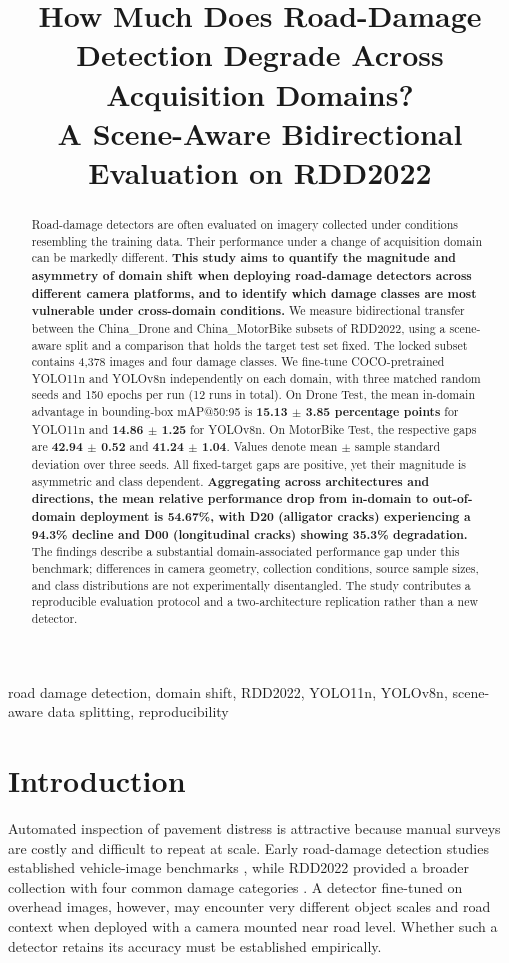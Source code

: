 \documentclass[conference,a4paper]{IEEEtran}
\title{How Much Does Road-Damage Detection Degrade Across Acquisition Domains?\\A Scene-Aware Bidirectional Evaluation on RDD2022}
\author{\IEEEauthorblockN{Lê Thành Luân\IEEEauthorrefmark{1}, Phạm Bá Anh Tuấn\IEEEauthorrefmark{2}}\IEEEauthorblockA{University of Science and Technology -- The University of Danang, Da Nang, Vietnam\\\IEEEauthorrefmark{1}102250416@hv.dut.udn.vn; \IEEEauthorrefmark{2}102250421@hv.dut.udn.vn}}
\begin{document}
\maketitle
\begin{abstract}
Road-damage detectors are often evaluated on imagery collected under conditions resembling the training data. Their performance under a change of acquisition domain can be markedly different. \textbf{This study aims to quantify the magnitude and asymmetry of domain shift when deploying road-damage detectors across different camera platforms, and to identify which damage classes are most vulnerable under cross-domain conditions.} We measure bidirectional transfer between the China\_Drone and China\_MotorBike subsets of RDD2022, using a scene-aware split and a comparison that holds the target test set fixed. The locked subset contains 4,378 images and four damage classes. We fine-tune COCO-pretrained YOLO11n and YOLOv8n independently on each domain, with three matched random seeds and 150 epochs per run (12 runs in total). On Drone Test, the mean in-domain advantage in bounding-box mAP@50:95 is \textbf{15.13 $\pm$ 3.85 percentage points} for YOLO11n and \textbf{14.86 $\pm$ 1.25} for YOLOv8n. On MotorBike Test, the respective gaps are \textbf{42.94 $\pm$ 0.52} and \textbf{41.24 $\pm$ 1.04}. Values denote mean $\pm$ sample standard deviation over three seeds. All fixed-target gaps are positive, yet their magnitude is asymmetric and class dependent. \textbf{Aggregating across architectures and directions, the mean relative performance drop from in-domain to out-of-domain deployment is 54.67\%, with D20 (alligator cracks) experiencing a 94.3\% decline and D00 (longitudinal cracks) showing 35.3\% degradation.} The findings describe a substantial domain-associated performance gap under this benchmark; differences in camera geometry, collection conditions, source sample sizes, and class distributions are not experimentally disentangled. The study contributes a reproducible evaluation protocol and a two-architecture replication rather than a new detector.
\end{abstract}
\begin{IEEEkeywords}
road damage detection, domain shift, RDD2022, YOLO11n, YOLOv8n, scene-aware data splitting, reproducibility
\end{IEEEkeywords}
\section{Introduction}
Automated inspection of pavement distress is attractive because manual surveys are costly and difficult to repeat at scale. Early road-damage detection studies established vehicle-image benchmarks \cite{maeda2018road}, while RDD2022 provided a broader collection with four common damage categories \cite{arya2024rdd2022}. A detector fine-tuned on overhead images, however, may encounter very different object scales and road context when deployed with a camera mounted near road level. Whether such a detector retains its accuracy must be established empirically.
\end{document}
